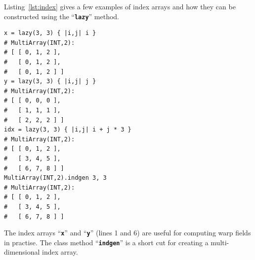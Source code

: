\documentclass[12pt,a4paper,oneside,openright]{book}
\newcommand{\lst}[1]{Listing~\ref{lst:#1}}
\newcommand{\code}[1]{``\texttt{\textbf{\textcolor{codegray}{\small{#1}}}}''}
\begin{document}
\begin{CJK}{UTF8}{}
\lst{index} gives a few examples of index arrays and how they can be constructed using the \code{lazy} method.
\lstset{language=Ruby,frame=single,numbers=left}
\begin{lstlisting}[float=htbp,caption={Index arrays},escapechar=\$,label=lst:index]
x = lazy(3, 3) { |i,j| i }
# MultiArray(INT,2):
# [ [ 0, 1, 2 ],
#   [ 0, 1, 2 ],
#   [ 0, 1, 2 ] ]
y = lazy(3, 3) { |i,j| j }
# MultiArray(INT,2):
# [ [ 0, 0, 0 ],
#   [ 1, 1, 1 ],
#   [ 2, 2, 2 ] ]
idx = lazy(3, 3) { |i,j| i + j * 3 }
# MultiArray(INT,2):
# [ [ 0, 1, 2 ],
#   [ 3, 4, 5 ],
#   [ 6, 7, 8 ] ]
MultiArray(INT,2).indgen 3, 3
# MultiArray(INT,2):
# [ [ 0, 1, 2 ],
#   [ 3, 4, 5 ],
#   [ 6, 7, 8 ] ]
\end{lstlisting}
The index arrays \code{x} and \code{y} (lines 1 and 6) are useful for computing warp fields in practise. The class method \code{indgen} is a short cut for creating a multi-dimensional index array.


\end{CJK}
\end{document}
